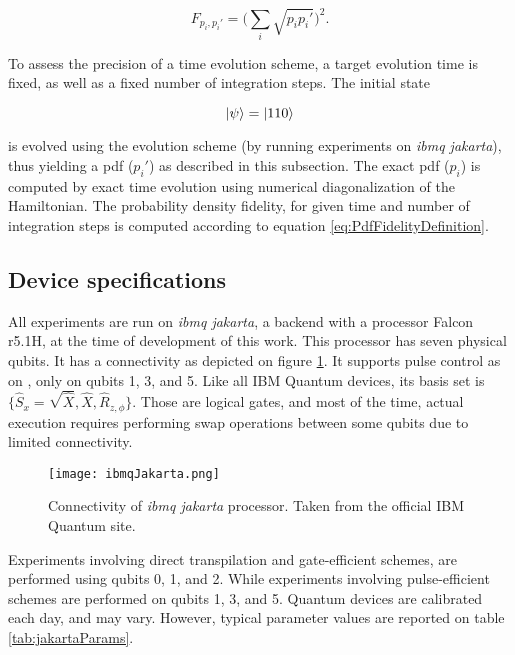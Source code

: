       \begin{equation}
        F_{p_i, p_i'} = \big(\sum_i \sqrt{p_i p_i'}\big)^2.
        \label{eq:PdfFidelityDefinition}
      \end{equation}

      To assess the precision of a time evolution scheme, a target evolution time is fixed, as well as a fixed number of integration steps. The initial state

      \begin{equation}
        \ket{\psi} = \ket{110}
        \label{eq:initialStateBenchmark}
      \end{equation}

      \noindent is evolved using the evolution scheme (by running experiments on \textit{ibmq jakarta}), thus yielding a pdf ($p_i'$) as described in this subsection. The exact pdf ($p_i$) is computed by exact time evolution using numerical diagonalization of the Hamiltonian. The probability density fidelity, for given time and number of integration steps is computed according to equation \ref{eq:PdfFidelityDefinition}.

  \subsection{Device specifications}
  \label{subsec:ibmq_jakartaSpecs}

    All experiments are run on \textit{ibmq jakarta}, a backend with a processor Falcon r5.1H, at the time of development of this work. This processor has seven physical qubits. It has a connectivity as depicted on figure \ref{fig:JakartaConnectivity}. It supports pulse control as on \cite{RXZPulseEfficient}, only on qubits 1, 3, and 5. Like all IBM Quantum devices, its basis set is $\{\hat{S}_x = \sqrt{\hat{X}}, \hat{X}, \hat{R}_{z,\phi} \}$. Those are logical gates, and most of the time, actual execution requires performing swap operations between some qubits due to limited connectivity.

    \begin{figure}
      \centering
      \texttt{[image: ibmqJakarta.png]}
      \caption{Connectivity of \textit{ibmq jakarta} processor. Taken from the official IBM Quantum site.}
      \label{fig:JakartaConnectivity}
    \end{figure}

    Experiments involving direct transpilation and gate-efficient schemes, are performed using qubits 0, 1, and 2. While experiments involving pulse-efficient schemes are performed on qubits 1, 3, and 5. Quantum devices are calibrated each day, and may vary. However, typical parameter values are reported on table \ref{tab:jakartaParams}.

